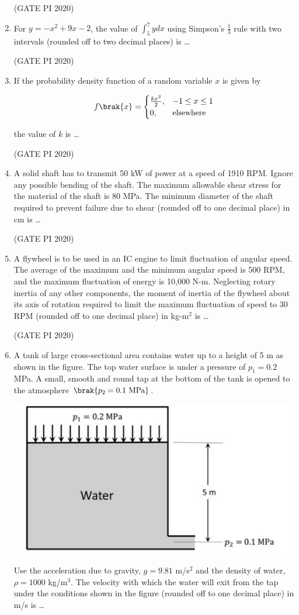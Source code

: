\documentclass[journal,12pt,onecolumn]{IEEEtran}
\theoremstyle{remark}
\begin{document}
\begin{enumerate}
\hfill (GATE PI 2020)

\item For $y = -x^2 + 9x - 2$, the value of $\int_5^7 ydx$ using Simpson's $\frac{1}{3}$ rule with two intervals (rounded off to two decimal places) is \dots

\hfill (GATE PI 2020)

\item If the probability density function of a random variable $x$ is given by

\begin{align*}
f\brak{x} =
\begin{cases}
\frac{kx^2}{2}, & -1 \leq x \leq 1 \\
0, & \text{elsewhere}
\end{cases}
\end{align*}

the value of $k$ is \dots

\hfill (GATE PI 2020)

\item A solid shaft has to transmit 50 kW of power at a speed of 1910 RPM. Ignore any possible bending of the shaft. The maximum allowable shear stress for the material of the shaft is 80 MPa. The minimum diameter of the shaft required to prevent failure due to shear (rounded off to one decimal place) in cm is \dots

\hfill (GATE PI 2020)

\item A flywheel is to be used in an IC engine to limit fluctuation of angular speed. The average of the maximum and the minimum angular speed is 500 RPM, and the maximum fluctuation of energy is 10,000 N-m. Neglecting rotary inertia of any other components, the moment of inertia of the flywheel about its axis of rotation required to limit the maximum fluctuation of speed to 30 RPM (rounded off to one decimal place) in kg-m$^2$ is \dots

\hfill (GATE PI 2020)

\item A tank of large cross-sectional area contains water up to a height of 5 m as shown in the figure. The top water surface is under a pressure of $p_1 = 0.2$ MPa. A small, smooth and round tap at the bottom of the tank is opened to the atmosphere $\brak{p_2 = 0.1\text{ MPa}}$.\
\begin{center}
\includegraphics[width=0.5\columnwidth]{figs/fig14.png}
\end{center}
Use the acceleration due to gravity, $g = 9.81$ m/s$^2$ and the density of water, $\rho = 1000$ kg/m$^3$. The velocity with which the water will exit from the tap under the conditions shown in the figure (rounded off to one decimal place) in m/s is \dots 


\end{enumerate}
\end{document}
